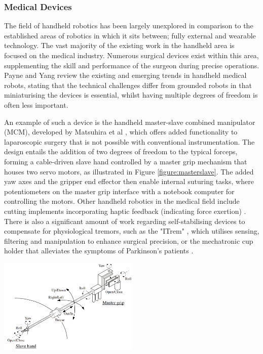 \documentclass[11pt]{article}
\begin{document}
\subsubsection{Medical Devices}
The field of handheld robotics has been largely unexplored in comparison to the established areas of robotics in which it sits between; fully external and wearable technology. The vast majority of the existing work in the handheld area is focused on the medical industry. Numerous surgical devices exist within this area, supplementing the skill and performance of the surgeon during precise operations. Payne and Yang \cite{Payne2014} review the existing and emerging trends in handheld medical robots, stating that the technical challenges differ from grounded robots in that miniaturising the devices is essential, whilst having multiple degrees of freedom is often less important.

An example of such a device is the handheld master-slave combined manipulator (MCM), developed by Matsuhira et al \cite{Matsuhira2002}, which offers added functionality to laparoscopic surgery that is not possible with conventional instrumentation. The design entails the addition of two degrees of freedom to the typical forceps, forming a cable-driven slave hand controlled by a master grip mechanism that houses two servo motors, as illustrated in Figure \ref{figure:masterslave}. The added yaw axes and the gripper end effector then enable internal suturing tasks, where potentiometers on the master grip interface with a notebook computer for controlling the motors. Other handheld robotics in the medical field include cutting implements incorporating haptic feedback (indicating force exertion) \cite{Payne2015}. There is also a significant amount of work regarding self-stabilising devices to compensate for physiological tremors, such as the  "ITrem" \cite{Latt2009}, which utilises sensing, filtering and manipulation to enhance surgical precision, or the mechatronic cup holder that alleviates the symptoms of Parkinson's patients \cite{Fischer2010}.

\begin{center}
\includegraphics[width=0.5\textwidth]{laparascopic.png}
\label{figure:masterslave}
\end{center}
\end{document}
